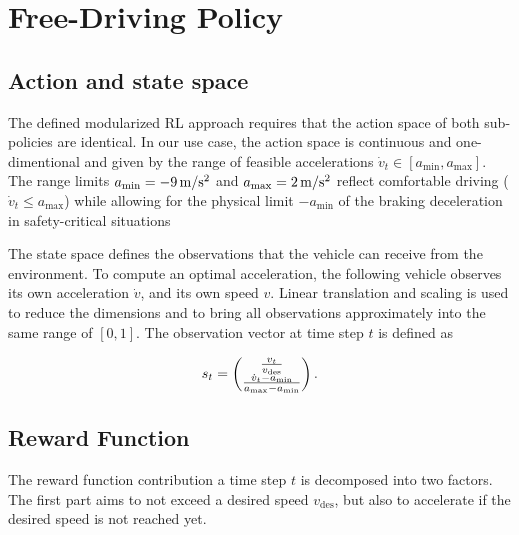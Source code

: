 \documentclass[review]{elsarticle}
\providecommand{\martin}[1]{#1}                  %
\providecommand{\martinc}[1]{}                  %
\providecommand{\sub}[1]{_{\mathrm{#1}}}  %
\providecommand{\3}{{\ss}}
\begin{document}
  
  



\section{Free-Driving Policy}
\label{sec:FreeDrivingPolicy}
\subsection{Action and state space}
\label{stateSpaceFree}
 The defined modularized RL approach requires that the action space of
 both sub-policies are identical. \martin{In our use case, the action space is
 continuous and one-dimentional and given by the range of feasible accelerations
 $\dot{v}_t \in [a\sub{min}, a\sub{max}]$. The range limits
 $a\sub{min}= \unit[-9]{m/s^2}$ and  $a\sub{max} =\unit[2]{m/s^2}$
 reflect comfortable driving ($\dot{v}_t \le a\sub{max}$) while
 allowing for the physical limit $-a\sub{min}$ of the braking
 deceleration} in safety-critical
situations

The state space defines the observations that the 
vehicle can receive from the environment. To compute an optimal
acceleration, the following vehicle observes its own acceleration $\dot{v}$,
and its own speed $v$. Linear translation and scaling is used to
reduce the dimensions and to bring all observations approximately into
the same range of $[0,1]$. The observation \martin{vector} at time step $t$ is defined
as 

\begin{equation}
\label{eq:stateFree}
s_t = \begin{pmatrix} \frac{v_t}{v\sub{des}} \\ \frac{\martin{\dot{v}}_t-a\sub{\rm min}}{a\sub{\rm max} - a\sub{\rm min}}\end{pmatrix}.
\end{equation}
\subsection{Reward Function}
\label{rewardFunctionFree}
The reward function contribution a time step $t$ is decomposed into two factors. The first part aims to
not exceed a desired speed $v\sub{des}$, but also to accelerate if the
desired speed is not reached yet.  
\martinc{Man sollte auch den Fall $v>v\sub{des}$ ber\"ucksichtigen,
  der z.B. durch Einfahren in ein Streckensegment mit niedrigerem
  Tempolimit (Ortseinfahrt) realisiert wird, aber nicht so
  drastisch/unstetig wie hier, z.B. zweiten Fall durch
  $(v\sub{des}-v)/v\sub{des}$ statt =0 ersetzen}
\end{document}
